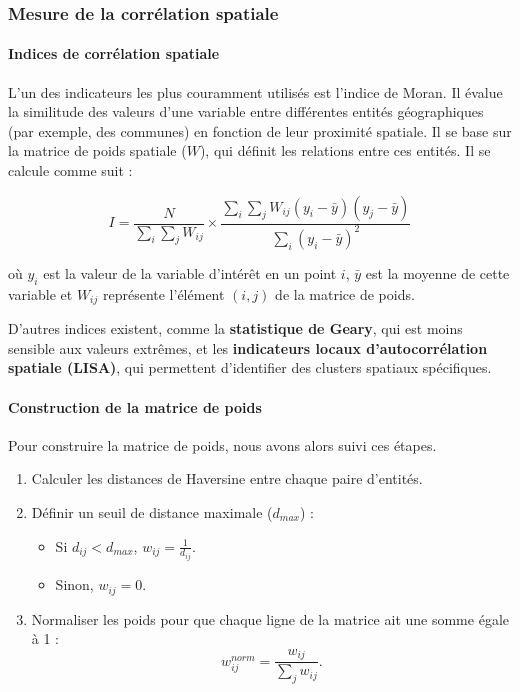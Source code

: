 \documentclass[
]{article}
\providecommand{\tightlist}{%
  \setlength{\itemsep}{0pt}\setlength{\parskip}{0pt}}
\begin{document}
\subsubsection{Mesure de la corrélation
spatiale}\label{mesure-de-la-corruxe9lation-spatiale}

\paragraph{Indices de corrélation
spatiale}\label{indices-de-corruxe9lation-spatiale}

L'un des indicateurs les plus couramment utilisés est l'indice de Moran.
Il évalue la similitude des valeurs d'une variable entre différentes
entités géographiques (par exemple, des communes) en fonction de leur
proximité spatiale. Il se base sur la matrice de poids spatiale (\(W\)),
qui définit les relations entre ces entités. Il se calcule comme suit :

\[
I = \frac{N}{\sum_{i} \sum_{j} W_{ij}} \times \frac{\sum_{i} \sum_{j} W_{ij} (y_i - \bar{y})(y_j - \bar{y})}{\sum_{i} (y_i - \bar{y})^2}
\]

où \(y_i\) est la valeur de la variable d'intérêt en un point \(i\),
\(\bar{y}\) est la moyenne de cette variable et \(W_{ij}\) représente
l'élément \((i, j)\) de la matrice de poids.

D'autres indices existent, comme la \textbf{statistique de Geary}, qui
est moins sensible aux valeurs extrêmes, et les
\textbf{indicateurs locaux d'autocorrélation spatiale (LISA)}, qui
permettent d'identifier des clusters spatiaux spécifiques.

\paragraph{Construction de la matrice de
poids}\label{construction-de-la-matrice-de-poids}

\hfill\break
Pour construire la matrice de poids, nous avons alors suivi ces
étapes.\\

\begin{enumerate}
\def\labelenumi{\arabic{enumi}.}
\tightlist
\item
  Calculer les distances de Haversine entre chaque paire d'entités.
\item
  Définir un seuil de distance maximale (\(d_{max}\)) :

  \begin{itemize}
  \tightlist
  \item
    Si \(d_{ij} < d_{max}\), \(w_{ij} = \frac{1}{d_{ij}}\).
  \item
    Sinon, \(w_{ij} = 0\).
  \end{itemize}
\item
  Normaliser les poids pour que chaque ligne de la matrice ait une somme
  égale à 1 : \[
   w_{ij}^{norm} = \frac{w_{ij}}{\sum_{j} w_{ij}}.
  \]
\end{enumerate}
\end{document}
